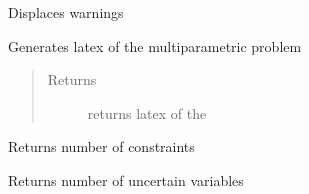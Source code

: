 \documentclass[letterpaper,10pt,english]{sphinxmanual}
\begin{document}
\begin{fulllineitems}
\begin{fulllineitems}
\label{\detokenize{mpo:mpo.mp_program.MPLP_Program.display_warnings}}
\sphinxAtStartPar
Displaces warnings

\end{fulllineitems}


\begin{fulllineitems}
\label{\detokenize{mpo:mpo.mp_program.MPLP_Program.latex}}
\sphinxAtStartPar
Generates latex of the multiparametric problem
\begin{quote}\begin{description}
\item[{Returns}] \leavevmode
\sphinxAtStartPar
returns latex of the

\end{description}\end{quote}

\end{fulllineitems}


\begin{fulllineitems}
\label{\detokenize{mpo:mpo.mp_program.MPLP_Program.num_constraints}}
\sphinxAtStartPar
Returns number of constraints

\end{fulllineitems}


\begin{fulllineitems}
\label{\detokenize{mpo:mpo.mp_program.MPLP_Program.num_t}}
\sphinxAtStartPar
Returns number of uncertain variables

\end{fulllineitems}


\end{fulllineitems}
\end{document}
